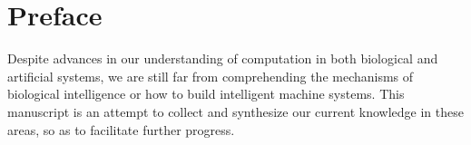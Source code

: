 \chapter*{Preface}

Despite advances in our understanding of computation in both biological and artificial systems, we are still far from comprehending the mechanisms of biological intelligence or how to build intelligent machine systems. This manuscript is an attempt to collect and synthesize our current knowledge in these areas, so as to facilitate further progress.